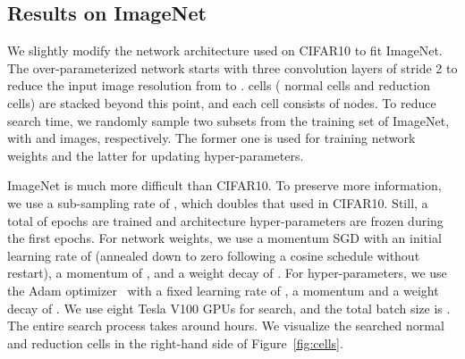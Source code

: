 \documentclass{article} \usepackage{iclr2020_conference,times}
\begin{document}
\subsection{Results on ImageNet}
\label{Experiments:ImageNet}

We slightly modify the network architecture used on CIFAR10 to fit ImageNet. The over-parameterized network starts with three convolution layers of stride 2 to reduce the input image resolution from  to .  cells ( normal cells and  reduction cells) are stacked beyond this point, and each cell consists of  nodes. To reduce search time, we randomly sample two subsets from the  training set of ImageNet, with  and  images, respectively. The former one is used for training network weights and the latter for updating hyper-parameters.

ImageNet is much more difficult than CIFAR10. To preserve more information, we use a sub-sampling rate of , which doubles that used in CIFAR10. Still, a total of  epochs are trained and architecture hyper-parameters are frozen during the first  epochs. For network weights, we use a momentum SGD with an initial learning rate of  (annealed down to zero following a cosine schedule without restart), a momentum of , and a weight decay of . For hyper-parameters, we use the Adam optimizer~\citep{kingma2014adam} with a fixed learning rate of , a momentum  and a weight decay of . We use eight Tesla V100 GPUs for search, and the total batch size is . The entire search process takes around  hours. We visualize the searched normal and reduction cells in the right-hand side of Figure~\ref{fig:cells}.
\end{document}
